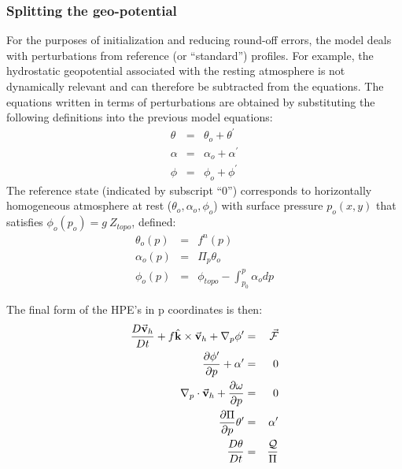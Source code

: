 \subsubsection{Splitting the geo-potential}

For the purposes of initialization and reducing round-off errors, the model
deals with perturbations from reference (or ``standard'') profiles. For
example, the hydrostatic geopotential associated with the resting atmosphere
is not dynamically relevant and can therefore be subtracted from the
equations. The equations written in terms of perturbations are obtained by
substituting the following definitions into the previous model equations: 
\begin{eqnarray*}
\theta &=&\theta _{o}+\theta ^{\prime } \\
\alpha &=&\alpha _{o}+\alpha ^{\prime } \\
\phi &=&\phi _{o}+\phi ^{\prime }
\end{eqnarray*}
The reference state (indicated by subscript ``0'') corresponds to
horizontally homogeneous atmosphere at rest ($\theta _{o},\alpha _{o},\phi
_{o}$) with surface pressure $p_{o}(x,y)$ that satisfies $\phi
_{o}(p_{o})=g~Z_{topo}$, defined: 
\begin{eqnarray*}
\theta _{o}(p) &=&f^{n}(p) \\
\alpha _{o}(p) &=&\Pi _{p}\theta _{o} \\
\phi _{o}(p) &=&\phi _{topo}-\int_{p_{0}}^{p}\alpha _{o}dp
\end{eqnarray*}

The final form of the HPE's in p coordinates is then: 
\begin{eqnarray}
\frac{D\vec{\mathbf{v}}_{h}}{Dt}+f\hat{\mathbf{k}}\times \vec{\mathbf{v}}%
_{h}+\mathbf{\nabla }_{p}\phi ^{\prime } &=&\vec{\mathbf{\mathcal{F}}}
\label{eq-p-hmom} \\
\frac{\partial \phi ^{\prime }}{\partial p}+\alpha ^{\prime } &=&0
\label{eq-p-hydro} \\
\mathbf{\nabla }_{p}\cdot \vec{\mathbf{v}}_{h}+\frac{\partial \omega }{%
\partial p} &=&0  \label{eq-p-cont} \\
\frac{\partial \Pi }{\partial p}\theta ^{\prime } &=&\alpha ^{\prime }
\label{eq-p-eos} \\
\frac{D\theta }{Dt} &=&\frac{\mathcal{Q}}{\Pi }  \label{eq-p-heat}
\end{eqnarray}

